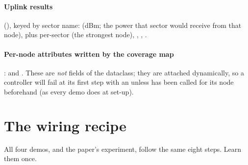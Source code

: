 \paragraph{Uplink results} (), keyed by sector name:
 (dBm; the power that sector would receive from that node), plus per-sector  (the strongest node), , , .

\paragraph{Per-node attributes written by the coverage map}:  and . These are \emph{not} fields of the  dataclass; they are attached dynamically, so a controller will fail at its first step with an  unless  has been called for its node beforehand (as every demo does at set-up).

\section{The wiring recipe}
\label{sec:recipe}

All four demos, and the paper's experiment, follow the same eight steps. Learn them once.

